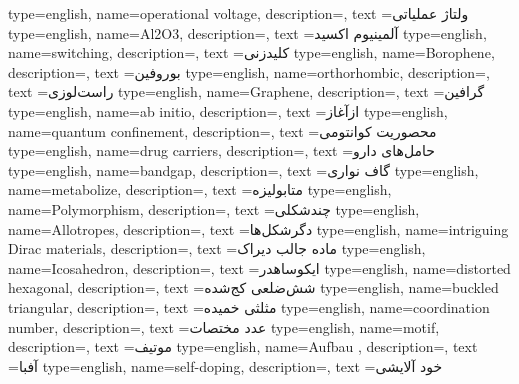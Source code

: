 {
    type=english,
    name={operational voltage},
    description={},
    text ={ولتاژ عملیاتی}
}
{
    type=english,
    name={Al2O3},
    description={},
    text ={آلمینیوم اکسید}
}
{
    type=english,
    name={switching},
    description={},
    text ={کلیدزنی}
}
{
    type=english,
    name={Borophene},
    description={},
    text ={بوروفین}
}
{
    type=english,
    name={orthorhombic},
    description={},
    text ={راست‌لوزی}
}
{
    type=english,
    name={Graphene},
    description={},
    text ={گرافین}
}
{
    type=english,
    name={ab initio},
    description={},
    text ={از‌آغاز}
}
{
    type=english,
    name={quantum confinement},
    description={},
    text ={محصوریت کوانتومی}
}
{
    type=english,
    name={drug carriers},
    description={},
    text ={حامل‌های دارو}
}
{
    type=english,
    name={bandgap},
    description={},
    text ={گاف نواری}
}
{
    type=english,
    name={metabolize},
    description={},
    text ={متابولیزه}
}
{
    type=english,
    name={Polymorphism},
    description={},
    text ={چندشکلی}
}
{
    type=english,
    name={Allotropes},
    description={},
    text ={دگرشکل‌ها}
}
{
    type=english,
    name={intriguing Dirac materials},
    description={},
    text ={ماده‌ جالب‌ دیراک}
}
{
    type=english,
    name={Icosahedron},
    description={},
    text ={ایکوساهدر}
}
{
    type=english,
    name={distorted hexagonal},
    description={},
    text ={شش‌ضلعی کج‌شده}
}
{
    type=english,
    name={buckled triangular},
    description={},
    text ={مثلثی خمیده}
}
{
    type=english,
    name={coordination number},
    description={},
    text ={عدد مختصات}
}
{
    type=english,
    name={motif},
    description={},
    text ={موتیف}
}
{
    type=english,
    name={Aufbau },
    description={},
    text ={آفبا}
}
{
    type=english,
    name={self-doping},
    description={},
    text ={خود آلایشی}
}
